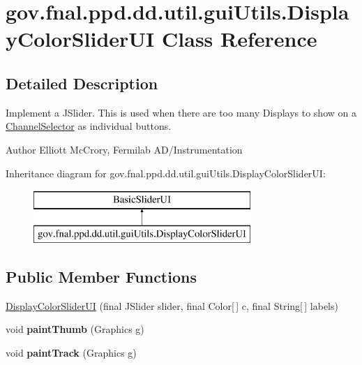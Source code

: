 \hypertarget{classgov_1_1fnal_1_1ppd_1_1dd_1_1util_1_1guiUtils_1_1DisplayColorSliderUI}{\section{gov.\-fnal.\-ppd.\-dd.\-util.\-gui\-Utils.\-Display\-Color\-Slider\-U\-I Class Reference}
\label{classgov_1_1fnal_1_1ppd_1_1dd_1_1util_1_1guiUtils_1_1DisplayColorSliderUI}
}


\subsection{Detailed Description}
Implement a J\-Slider. This is used when there are too many Displays to show on a \hyperlink{classgov_1_1fnal_1_1ppd_1_1dd_1_1ChannelSelector}{Channel\-Selector} as individual buttons.

\begin{DoxyAuthor}{Author}
Elliott Mc\-Crory, Fermilab A\-D/\-Instrumentation 
\end{DoxyAuthor}
Inheritance diagram for gov.\-fnal.\-ppd.\-dd.\-util.\-gui\-Utils.\-Display\-Color\-Slider\-U\-I\-:\begin{figure}[H]
\begin{center}
\leavevmode
\includegraphics[height=2.000000cm]{classgov_1_1fnal_1_1ppd_1_1dd_1_1util_1_1guiUtils_1_1DisplayColorSliderUI}
\end{center}
\end{figure}
\subsection*{Public Member Functions}
\begin{DoxyCompactItemize}
\item 
\hyperlink{classgov_1_1fnal_1_1ppd_1_1dd_1_1util_1_1guiUtils_1_1DisplayColorSliderUI_a450ac978df6b89aaac352c20d5deb32e}{Display\-Color\-Slider\-U\-I} (final J\-Slider slider, final Color\mbox{[}$\,$\mbox{]} c, final String\mbox{[}$\,$\mbox{]} labels)
\item 
\hypertarget{classgov_1_1fnal_1_1ppd_1_1dd_1_1util_1_1guiUtils_1_1DisplayColorSliderUI_a4511f015e848a3c0fc9559d293d35243}{void {\bfseries paint\-Thumb} (Graphics g)}\label{classgov_1_1fnal_1_1ppd_1_1dd_1_1util_1_1guiUtils_1_1DisplayColorSliderUI_a4511f015e848a3c0fc9559d293d35243}

\item 
\hypertarget{classgov_1_1fnal_1_1ppd_1_1dd_1_1util_1_1guiUtils_1_1DisplayColorSliderUI_abcaf76f68e648a8b4b79f37014ab628a}{void {\bfseries paint\-Track} (Graphics g)}\label{classgov_1_1fnal_1_1ppd_1_1dd_1_1util_1_1guiUtils_1_1DisplayColorSliderUI_abcaf76f68e648a8b4b79f37014ab628a}

\end{DoxyCompactItemize}
